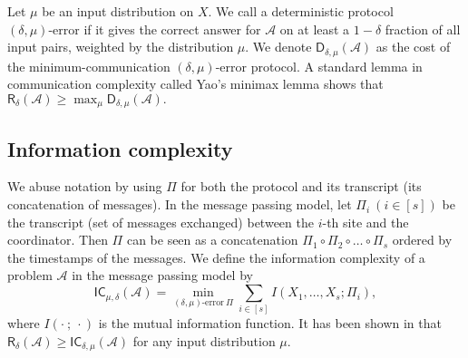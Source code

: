 Let $\mu$ be an input distribution on $X$. We call a deterministic protocol $(\delta, \mu)\text{-error}$ if it gives the correct answer for $\mathcal{A}$ on at least a $1 - \delta$ fraction of all input pairs, weighted by the distribution $\mu$. We denote $\mathsf{D}_{\delta, \mu}(\mathcal{A})$ as the cost of the minimum-communication $(\delta, \mu)\text{-error}$ protocol. A standard lemma in communication complexity called Yao's minimax lemma shows that 
$\mathsf{R}_{\delta}(\mathcal{A}) \ge \max_\mu \mathsf{D}_{\delta, \mu}(\mathcal{A}).$

\subsection{Information complexity}  We abuse notation by using $\Pi$ for both the protocol and its transcript (its concatenation of messages). In the message passing model, let $\Pi_i\ (i \in [s])$ be the transcript (set of messages exchanged) between the $i$-th site and the coordinator.  Then $\Pi$ can be seen as a concatenation $\Pi_1 \circ \Pi_2 \circ \ldots \circ \Pi_s$ ordered by the timestamps of the messages.
We define the information complexity of a problem $\mathcal{A}$ in the message passing model by 
\[
\mathsf{IC}_{\mu, \delta}(\mathcal{A}) = \min_{(\delta, \mu)\text{-error}\ \Pi} \sum_{i \in [s]} I(X_1, \ldots, X_s; \Pi_i),
\]where $I(\cdot\ ;\ \cdot)$ is the mutual information function. It has been shown in \cite{HRVZ15} that $\mathsf{R}_{\delta}(\mathcal{A}) \ge \mathsf{IC}_{\delta, \mu}(\mathcal{A})$ for any input distribution $\mu$.





